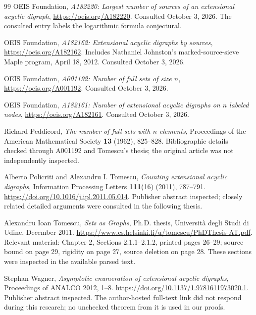 \documentclass[11pt,a4paper]{article}
\theoremstyle{definition}
\begin{document}
\begingroup\raggedright
\begin{thebibliography}{99}
OEIS Foundation, \emph{A182220: Largest number of sources of an extensional
acyclic digraph}, \url{https://oeis.org/A182220}.
Consulted October 3, 2026. The consulted entry labels the logarithmic
formula conjectural.

OEIS Foundation, \emph{A182162: Extensional acyclic digraphs by sources},
\url{https://oeis.org/A182162}. Includes Nathaniel Johnston's
marked-source-sieve Maple program, April 18, 2012.
Consulted October 3, 2026.

OEIS Foundation, \emph{A001192: Number of full sets of size $n$},
\url{https://oeis.org/A001192}. Consulted October 3, 2026.

OEIS Foundation, \emph{A182161: Number of extensional acyclic digraphs on
$n$ labeled nodes}, \url{https://oeis.org/A182161}.
Consulted October 3, 2026.

Richard Peddicord, \emph{The number of full sets with $n$ elements},
Proceedings of the American Mathematical Society \textbf{13} (1962),
825--828. Bibliographic details checked through A001192 and Tomescu's
thesis; the original article was not independently inspected.

Alberto Policriti and Alexandru I. Tomescu,
\emph{Counting extensional acyclic digraphs},
Information Processing Letters \textbf{111}(16) (2011), 787--791.
\url{https://doi.org/10.1016/j.ipl.2011.05.014}.
Publisher abstract inspected; closely related detailed arguments were
consulted in the following thesis.

Alexandru Ioan Tomescu, \emph{Sets as Graphs}, Ph.D. thesis,
Universit\`a degli Studi di Udine, December 2011.
\url{https://www.cs.helsinki.fi/u/tomescu/PhDThesis-AT.pdf}.
Relevant material: Chapter 2, Sections 2.1.1--2.1.2, printed pages 26--29;
source bound on page 29, rigidity on page 27, source deletion on page 28.
These sections were inspected in the available parsed text.

Stephan Wagner, \emph{Asymptotic enumeration of extensional acyclic
digraphs}, Proceedings of ANALCO 2012, 1--8.
\url{https://doi.org/10.1137/1.9781611973020.1}.
Publisher abstract inspected. The author-hosted full-text link did not
respond during this research; no unchecked theorem from it is used in
our proofs.


\end{thebibliography}
\end{document}
